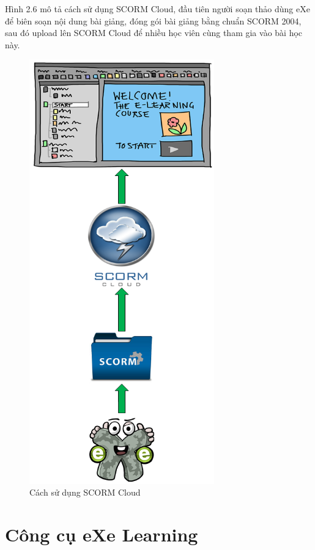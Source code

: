 Hình 2.6 mô tả cách sử dụng SCORM Cloud, đầu tiên người soạn thảo dùng eXe để biên soạn nội dung bài giảng, đóng gói bài giảng bằng chuẩn SCORM 2004, sau đó upload lên SCORM Cloud để nhiều học viên cùng tham gia vào bài học này.\\


\begin{center}
	\begin{figure}[htp]
		\begin{center}
			\includegraphics[width=8cm]{Chapter2/Pictures/picture26.png}
		\end{center}
		\caption{Cách sử dụng SCORM Cloud}
		\label{refpicture26}
	\end{figure}
\end{center}

\section{Công cụ eXe Learning}

